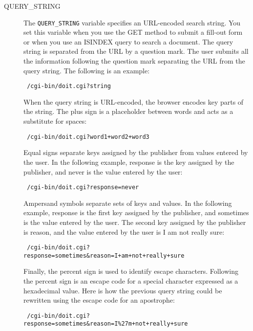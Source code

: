 \begin{description}
\item[QUERY\_STRING]

The \verb|QUERY_STRING| variable specifies an URL-encoded search string. You set
this variable when you use the GET method to submit a fill-out form or
when you use an ISINDEX query to search a document. The query string is
separated from the URL by a question mark. The user submits all the
information following the question mark separating the URL from the query
string. The following is an example:

{\footnotesize
\begin{verbatim}
 /cgi-bin/doit.cgi?string
\end{verbatim}
}


When the query string is URL-encoded, the browser encodes key parts of the
string. The plus sign is a placeholder between words and acts as a
substitute for spaces:

{\footnotesize
\begin{verbatim}
 /cgi-bin/doit.cgi?word1+word2+word3
\end{verbatim}
}

Equal signs separate keys assigned by the publisher from values entered by
the user. In the following example, response is the key assigned by the
publisher, and never is the value entered by the user:

{\footnotesize
\begin{verbatim}
 /cgi-bin/doit.cgi?response=never
\end{verbatim}
}

Ampersand symbols separate sets of keys and values. In the following
example, response is the first key assigned by the publisher, and
sometimes is the value entered by the user. The second key assigned by the
publisher is reason, and the value entered by the user is I am not really
sure:

{\footnotesize
\begin{verbatim}
 /cgi-bin/doit.cgi?response=sometimes&reason=I+am+not+really+sure
\end{verbatim}
}

Finally, the percent sign is used to identify escape characters. Following
the percent sign is an escape code for a special character expressed as a
hexadecimal value. Here is how the previous query string could be
rewritten using the escape code for an apostrophe:

{\footnotesize
\begin{verbatim}
 /cgi-bin/doit.cgi?response=sometimes&reason=I%27m+not+really+sure
\end{verbatim}
}



\end{description}
